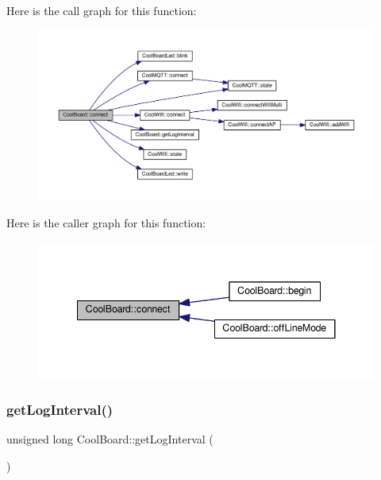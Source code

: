Here is the call graph for this function\+:
\nopagebreak
\begin{figure}[H]
\begin{center}
\leavevmode
\includegraphics[width=350pt]{classCoolBoard_a519de78b807f8ec6463ff484eb925918_cgraph}
\end{center}
\end{figure}
Here is the caller graph for this function\+:
\nopagebreak
\begin{figure}[H]
\begin{center}
\leavevmode
\includegraphics[width=341pt]{classCoolBoard_a519de78b807f8ec6463ff484eb925918_icgraph}
\end{center}
\end{figure}
\mbox{\label{classCoolBoard_a7508e029f2ee17bb747ffab599285e0d}} 
\subsubsection{\texorpdfstring{get\+Log\+Interval()}{getLogInterval()}}
{\footnotesize\ttfamily unsigned long Cool\+Board\+::get\+Log\+Interval (\begin{DoxyParamCaption}{ }\end{DoxyParamCaption})}

